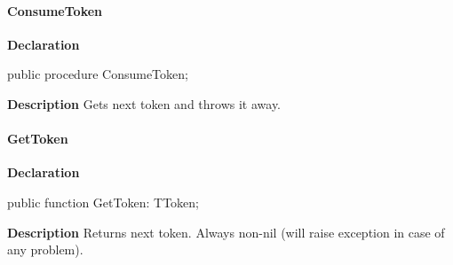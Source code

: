 \documentclass{report}
\newif\ifpdf
\begin{document}
\paragraph*{ConsumeToken}\hspace*{\fill}

\label{PasDoc_Scanner.TScanner-ConsumeToken}
\begin{list}{}{
\setlength{\itemindent}{0cm}
\setlength{\listparindent}{0cm}
\setlength{\leftmargin}{\evensidemargin}
\addtolength{\leftmargin}{\tmplength}
\settowidth{\labelsep}{X}
\addtolength{\leftmargin}{\labelsep}
\setlength{\labelwidth}{\tmplength}
}
\item[\textbf{Declaration}\hfill]
\ifpdf
\begin{flushleft}
\fi
\begin{ttfamily}
public procedure ConsumeToken;\end{ttfamily}

\ifpdf
\end{flushleft}
\fi

\par
\item[\textbf{Description}]
Gets next token and throws it away.

\end{list}
\paragraph*{GetToken}\hspace*{\fill}

\label{PasDoc_Scanner.TScanner-GetToken}
\begin{list}{}{
\setlength{\itemindent}{0cm}
\setlength{\listparindent}{0cm}
\setlength{\leftmargin}{\evensidemargin}
\addtolength{\leftmargin}{\tmplength}
\settowidth{\labelsep}{X}
\addtolength{\leftmargin}{\labelsep}
\setlength{\labelwidth}{\tmplength}
}
\item[\textbf{Declaration}\hfill]
\ifpdf
\begin{flushleft}
\fi
\begin{ttfamily}
public function GetToken: TToken;\end{ttfamily}

\ifpdf
\end{flushleft}
\fi

\par
\item[\textbf{Description}]
Returns next token. Always non{-}nil (will raise exception in case of any problem).

\end{list}
\end{document}
